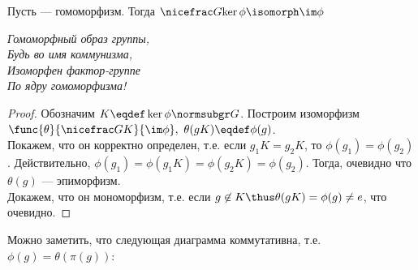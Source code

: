 \begin{theorem}\label{th:mainhom}
  Пусть  --- гомоморфизм. Тогда $\factorgr{G}{\ker\phi}\isomorph \im\phi$
  \begin{samepage}
    \begin{flushright}
      {\small\itshape%
        Гомоморфный образ группы,\nopagebreak\\%
        Будь во имя коммунизма,\nopagebreak\\%
        Изоморфен фактор-группе\nopagebreak\\%
        По ядру гомоморфизма!}
    \end{flushright}
  \end{samepage}
\end{theorem}
\begin{proof}
  Обозначим $K\eqdef\ker\phi\normsubgr G$. Построим изоморфизм $\func{\theta}{\factorgr{G}{K}}{\im\phi},\ \theta(gK)\eqdef\phi(g)$.\\
  Покажем, что он корректно определен, т.\:е. если $g_1K=g_2K$, то $\phi(g_1)=\phi(g_2)$. Действительно, $\phi(g_1)=\phi(g_1K)=\phi(g_2K)=\phi(g_2)$. Тогда, очевидно что $\theta(g)$ --- эпиморфизм. \\
  Докажем, что он мономорфизм, т.\:е. если $g\not\in K\thus \theta(gK)=\phi(g)\not=e$, что очевидно.
\end{proof}
\begin{remark}
  Можно заметить, что следующая диаграмма коммутативна, т.\:е. $\phi(g)=\theta(\pi(g))$:
  \begin{center}
    \centering
  \end{center}
\end{remark}

